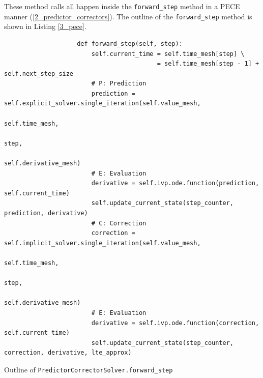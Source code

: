 \documentclass[12pt, twoside]{report}
\theoremstyle{plain}
\theoremstyle{definition}
\theoremstyle{definition}
\begin{document}
            These method calls all happen inside the 
            \texttt{forward_step} method in a PECE manner 
            (\ref{2_predictor_correctors}). The outline of the
            \texttt{forward_step} method is shown in Listing 
            \ref{3_pece}.
            \begin{listing}[H]
                \begin{verbatim}
                    def forward_step(self, step):
                        self.current_time = self.time_mesh[step] \
                                          = self.time_mesh[step - 1] + self.next_step_size
                        # P: Prediction
                        prediction = self.explicit_solver.single_iteration(self.value_mesh,
                                                                           self.time_mesh,
                                                                           step,
                                                                           self.derivative_mesh)
                        # E: Evaluation
                        derivative = self.ivp.ode.function(prediction, self.current_time)
                        self.update_current_state(step_counter, prediction, derivative)
                        # C: Correction
                        correction = self.implicit_solver.single_iteration(self.value_mesh,
                                                                           self.time_mesh,
                                                                           step,
                                                                           self.derivative_mesh)
                        # E: Evaluation
                        derivative = self.ivp.ode.function(correction, self.current_time)
                        self.update_current_state(step_counter, correction, derivative, lte_approx)
                \end{verbatim}
                \caption{Outline of 
                \texttt{PredictorCorrectorSolver.forward_step}}
                \label{3_pece}
            \end{listing}
\end{document}
